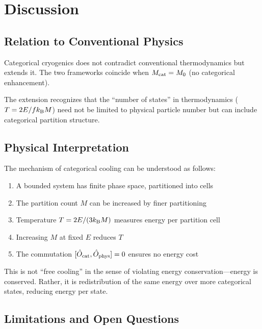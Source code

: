 \section{Discussion}

\subsection{Relation to Conventional Physics}

Categorical cryogenics does not contradict conventional thermodynamics but extends it. The two frameworks coincide when $M_{\mathrm{cat}} = M_0$ (no categorical enhancement).

The extension recognizes that the ``number of states'' in thermodynamics ($T = 2E/fk_{\mathrm{B}} M$) need not be limited to physical particle number but can include categorical partition structure.

\subsection{Physical Interpretation}

The mechanism of categorical cooling can be understood as follows:

\begin{enumerate}
    \item A bounded system has finite phase space, partitioned into cells
    \item The partition count $M$ can be increased by finer partitioning
    \item Temperature $T = 2E/(3k_{\mathrm{B}} M)$ measures energy per partition cell
    \item Increasing $M$ at fixed $E$ reduces $T$
    \item The commutation $[\hat{O}_{\mathrm{cat}}, \hat{O}_{\mathrm{phys}}] = 0$ ensures no energy cost
\end{enumerate}

This is not ``free cooling'' in the sense of violating energy conservation---energy is conserved. Rather, it is redistribution of the same energy over more categorical states, reducing energy per state.

\subsection{Limitations and Open Questions}

